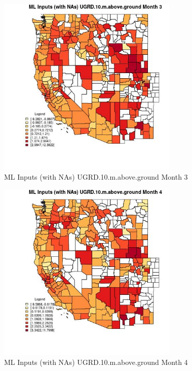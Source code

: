 \begin{figure} 
\centering  
\includegraphics[width=0.77\textwidth]{Code_Outputs/Report_ML_input_PM25_Step4_part_e_de_duplicated_aves_compiled_2019-05-21wNAs_CountyUGRD10mabovegroundmedianMonth3.jpg} 
\caption{\label{fig:Report_ML_input_PM25_Step4_part_e_de_duplicated_aves_compiled_2019-05-21wNAsCountyUGRD10mabovegroundmedianMonth3}ML Inputs (with NAs) UGRD.10.m.above.ground Month 3} 
\end{figure} 
 

\begin{figure} 
\centering  
\includegraphics[width=0.77\textwidth]{Code_Outputs/Report_ML_input_PM25_Step4_part_e_de_duplicated_aves_compiled_2019-05-21wNAs_CountyUGRD10mabovegroundmedianMonth4.jpg} 
\caption{\label{fig:Report_ML_input_PM25_Step4_part_e_de_duplicated_aves_compiled_2019-05-21wNAsCountyUGRD10mabovegroundmedianMonth4}ML Inputs (with NAs) UGRD.10.m.above.ground Month 4} 
\end{figure} 
 

